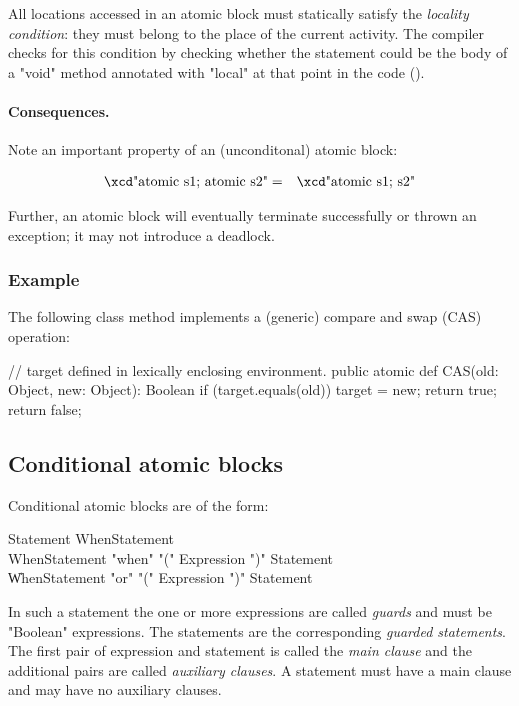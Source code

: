 {All locations accessed in an atomic block must statically satisfy the
{\em locality condition}: they must belong to the place of the current
activity.\label{LocalityCondition} The
compiler checks for this condition by checking whether the statement
could be the body of a \xcd"void" method annotated with \xcd"local" at
that point in the code ().

\paragraph{Consequences.}
Note an important property of an (unconditonal) atomic block:

\begin{eqnarray}
 \mbox{\xcd"atomic {s1; atomic s2}"} &=& \mbox{\xcd"atomic {s1; s2}"}
\end{eqnarray}

Further, an atomic block will eventually terminate successfully or
thrown an exception; it may not introduce a deadlock.


\subsubsection{Example}

The following class method implements a (generic) compare and swap (CAS) operation:

\begin{xten}
// target defined in lexically enclosing environment.
public atomic def CAS(old: Object, new: Object): Boolean {
   if (target.equals(old)) {
     target = new;
     return true;
   }
   return false;
}
\end{xten}

\subsection{Conditional atomic blocks}

Conditional atomic blocks are of the form:

\begin{grammar}
Statement \:  WhenStatement \\
WhenStatement \:  \xcd"when" \xcd"(" Expression \xcd")" Statement \\
            \| WhenStatement \xcd"or" \xcd"(" Expression \xcd")" Statement \\
\end{grammar}

In such a statement the one or more expressions are called {\em
guards} and must be \xcd"Boolean" expressions. The statements are the
corresponding {\em guarded statements}. The first pair of expression
and statement is called the {\em main clause} and the additional pairs
are called {\em auxiliary clauses}. A statement must have a main
clause and may have no auxiliary clauses.

}
